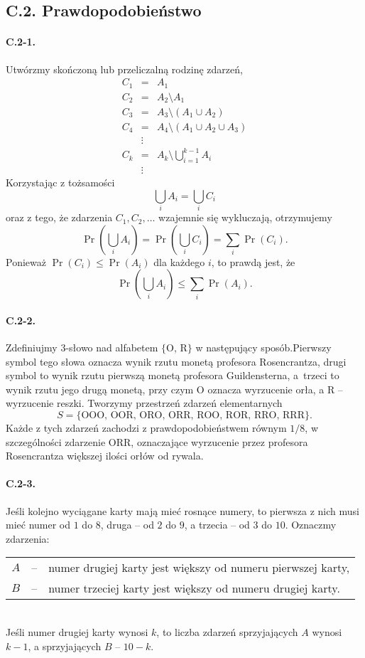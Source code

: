 \subsection*{C.2. Prawdopodobieństwo}

\paragraph{C.2-1.}
Utwórzmy skończoną lub przeliczalną rodzinę zdarzeń,
\begin{eqnarray*}
	C_1 &=& A_1 \\
	C_2 &=& A_2\setminus A_1 \\
	C_3 &=& A_3\setminus (A_1\cup A_2) \\
	C_4 &=& A_4\setminus (A_1\cup A_2\cup A_3) \\
	& \vdots \\
	C_k &=& A_k\setminus \bigcup_{i=1}^{k-1}A_i \\
	& \vdots
\end{eqnarray*}
Korzystając z tożsamości
\[
	\bigcup_iA_i = \bigcup_iC_i
\]
oraz z tego, że zdarzenia $C_1,C_2,\dots$ wzajemnie się wykluczają, otrzymujemy
\[
	\Pr\left(\bigcup_iA_i\right) = \Pr\left(\bigcup_iC_i\right) = \sum_i\Pr(C_i).
\]
Ponieważ $\Pr(C_i)\le\Pr(A_i)$ dla każdego $i$, to prawdą jest, że
\[
	\Pr\left(\bigcup_iA_i\right)\le\sum_i\Pr(A_i).
\]

\paragraph{C.2-2.}
Zdefiniujmy $3$-słowo nad alfabetem $\{{\scriptstyle\mathrm{O},\,\mathrm{R}}\}$ w następujący sposób.\linebreak Pierwszy symbol tego słowa oznacza wynik rzutu monetą profesora Rosencrantza, drugi symbol to wynik rzutu pierwszą monetą profesora Guildensterna, a~trzeci to wynik rzutu jego drugą monetą, przy czym $\scriptstyle\mathrm{O}$ oznacza wyrzucenie orła, a $\scriptstyle\mathrm{R}$ -- wyrzucenie reszki. Tworzymy przestrzeń zdarzeń elementarnych
\[
	S = \{{\scriptstyle\mathrm{OOO},\,\mathrm{OOR},\,\mathrm{ORO},\,\mathrm{ORR},\,\mathrm{ROO},\,\mathrm{ROR},\,\mathrm{RRO},\,\mathrm{RRR}}\}.
\]
Każde z tych zdarzeń zachodzi z prawdopodobieństwem równym $1/8$, w szczególności zdarzenie $\scriptstyle\mathrm{ORR}$, oznaczające wyrzucenie przez profesora Rosencrantza większej ilości orłów od rywala.

\paragraph{C.2-3.}
Jeśli kolejno wyciągane karty mają mieć rosnące numery, to pierwsza z nich musi mieć numer od $1$ do $8$, druga -- od $2$ do $9$, a trzecia -- od $3$ do $10$. Oznaczmy zdarzenia: \\
\begin{tabular}{rcl}
	$A$ &--& numer drugiej karty jest większy od numeru pierwszej karty, \\
	$B$ &--& numer trzeciej karty jest większy od numeru drugiej karty.
\end{tabular}
\\
Jeśli numer drugiej karty wynosi $k$, to liczba zdarzeń sprzyjających $A$ wynosi $k-1$, a sprzyjających $B$ -- $10-k$.

